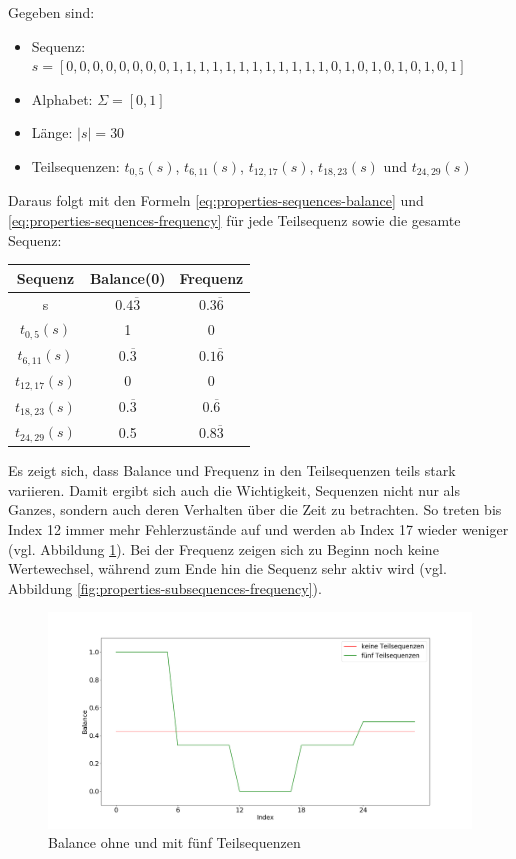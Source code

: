 \begin{theorem}
Gegeben sind:
\begin{itemize}[noitemsep]
	\item Sequenz: $s = [0,0,0,0,0,0,0,0,1,1,1,1,1,1,1,1,1,1,1,1,0,1,0,1,0,1,0,1,0,1]$
	\item Alphabet: $\Sigma = [0,1]$
	\item Länge: $|s| = 30$
	\item Teilsequenzen: $t_{0,5}(s)$, $t_{6,11}(s)$, $t_{12,17}(s)$, $t_{18,23}(s)$ und $t_{24,29}(s)$
\end{itemize}
Daraus folgt mit den Formeln \ref{eq:properties-sequences-balance} und \ref{eq:properties-sequences-frequency} für jede Teilsequenz sowie die gesamte Sequenz:

\begin{center}
	\begin{tabular}{|c c c|}
		\hline
		Sequenz & Balance(0) & Frequenz \\
		\hline\hline
		s & $0.4\overline{3}$ & $0.3\overline{6}$ \\ 
		\hline
		$t_{0,5}(s)$ & 1 & 0 \\ 
		\hline
		$t_{6,11}(s)$ & $0.\overline{3}$ & $0.1\overline{6}$ \\
		\hline
		$t_{12,17}(s)$ & 0 & 0 \\
		\hline
		$t_{18,23}(s)$ & $0.\overline{3}$ & $0.\overline{6}$ \\
		\hline
		$t_{24,29}(s)$ & 0.5 & $0.8\overline{3}$ \\
		\hline
	\end{tabular}
\end{center}



Es zeigt sich, dass Balance und Frequenz in den Teilsequenzen teils stark variieren. Damit ergibt sich auch die Wichtigkeit, Sequenzen nicht nur als Ganzes, sondern auch deren Verhalten über die Zeit zu betrachten. So treten bis Index 12 immer mehr Fehlerzustände auf und werden ab Index 17 wieder weniger (vgl. Abbildung \ref{fig:properties-subsequences-balance}). Bei der Frequenz zeigen sich zu Beginn noch keine Wertewechsel, während zum Ende hin die Sequenz sehr aktiv wird (vgl. Abbildung \ref{fig:properties-subsequences-frequency}).

\begin{figure}[H]
	\centering
	\includegraphics[scale=0.32]{images/sequences/subsequences-balance}
	\caption{Balance ohne und mit fünf Teilsequenzen}
	\label{fig:properties-subsequences-balance}
\end{figure}


\end{theorem}

